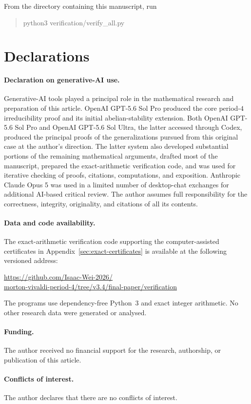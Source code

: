 \documentclass[11pt]{article}
\begin{document}
From the directory containing this manuscript, run
\begin{quote}
\noindent python3 verification/verify\_all.py
\end{quote}

\clearpage
\section*{Declarations}

\paragraph{Declaration on generative-AI use.}
Generative-AI tools played a principal role in the mathematical research
and preparation of this article.  OpenAI GPT-5.6 Sol Pro produced the
core period-$4$ irreducibility proof and its initial abelian-stability
extension.  Both OpenAI GPT-5.6 Sol Pro and OpenAI GPT-5.6 Sol Ultra, the
latter accessed through Codex, produced the principal proofs of the
generalizations pursued from this original case at the author's direction.
The latter system also
developed substantial portions of the remaining mathematical arguments,
drafted most of the manuscript, prepared the exact-arithmetic verification
code, and was used for iterative checking of proofs, citations,
computations, and exposition.  Anthropic Claude Opus 5 was used in a
limited number of desktop-chat exchanges for additional AI-based critical
review.  The author assumes full responsibility for the correctness,
integrity, originality, and citations of all its contents.

\paragraph{Data and code availability.}
The exact-arithmetic verification code supporting the computer-assisted
certificates in Appendix~\ref{sec:exact-certificates} is available at the
following versioned address:
\begin{center}
\href{https://github.com/Isaac-Wei-2026/morton-vivaldi-period-4/tree/v3.4/final-paper/verification}{https://github.com/Isaac-Wei-2026/\\
morton-vivaldi-period-4/tree/v3.4/final-paper/verification}
\end{center}
The programs use
dependency-free Python~3 and exact integer arithmetic.  No other research
data were generated or analysed.

\paragraph{Funding.}
The author received no financial support for the research, authorship,
or publication of this article.

\paragraph{Conflicts of interest.}
The author declares that there are no conflicts of interest.

\clearpage
{}
{}
{\small


}
\end{document}
